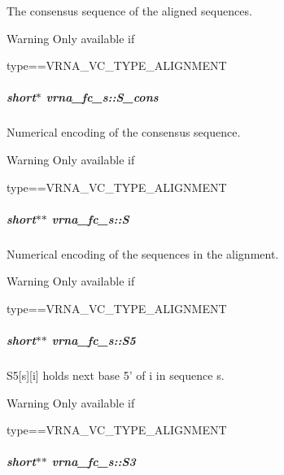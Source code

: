 The consensus sequence of the aligned sequences. 

\begin{DoxyWarning}{Warning}
Only available if\begin{DoxyVerb}type==VRNA_VC_TYPE_ALIGNMENT \end{DoxyVerb}
 
\end{DoxyWarning}
\hypertarget{group__fold__compound_aa3fab7ae38ebfed2028375221d295686}{
\subparagraph[{S\-\_\-cons}]{\setlength{\rightskip}{0pt plus 5cm}short$\ast$ vrna\-\_\-fc\-\_\-s\-::\-S\-\_\-cons}}\label{group__fold__compound_aa3fab7ae38ebfed2028375221d295686}


Numerical encoding of the consensus sequence. 

\begin{DoxyWarning}{Warning}
Only available if\begin{DoxyVerb}type==VRNA_VC_TYPE_ALIGNMENT \end{DoxyVerb}
 
\end{DoxyWarning}
\hypertarget{group__fold__compound_aebb37297f92c7bd22aac6343f8f61d61}{
\subparagraph[{S}]{\setlength{\rightskip}{0pt plus 5cm}short$\ast$$\ast$ vrna\-\_\-fc\-\_\-s\-::\-S}}\label{group__fold__compound_aebb37297f92c7bd22aac6343f8f61d61}


Numerical encoding of the sequences in the alignment. 

\begin{DoxyWarning}{Warning}
Only available if\begin{DoxyVerb}type==VRNA_VC_TYPE_ALIGNMENT \end{DoxyVerb}
 
\end{DoxyWarning}
\hypertarget{group__fold__compound_a78d089b475e2230bd536b9a6ed8bb17c}{
\subparagraph[{S5}]{\setlength{\rightskip}{0pt plus 5cm}short$\ast$$\ast$ vrna\-\_\-fc\-\_\-s\-::\-S5}}\label{group__fold__compound_a78d089b475e2230bd536b9a6ed8bb17c}


S5\mbox{[}s\mbox{]}\mbox{[}i\mbox{]} holds next base 5' of i in sequence s. 

\begin{DoxyWarning}{Warning}
Only available if\begin{DoxyVerb}type==VRNA_VC_TYPE_ALIGNMENT \end{DoxyVerb}
 
\end{DoxyWarning}
\hypertarget{group__fold__compound_af6ab2a25b84d2308ee23f6b11b5fd52d}{
\subparagraph[{S3}]{\setlength{\rightskip}{0pt plus 5cm}short$\ast$$\ast$ vrna\-\_\-fc\-\_\-s\-::\-S3}}\label{group__fold__compound_af6ab2a25b84d2308ee23f6b11b5fd52d}


